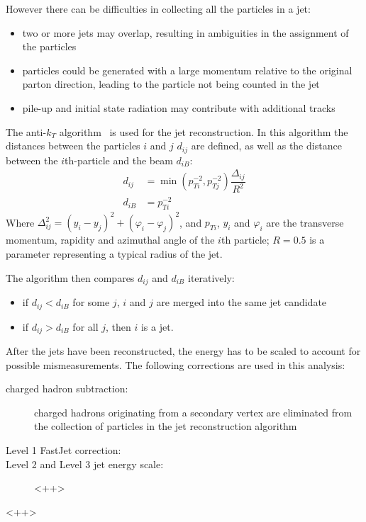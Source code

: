 However there can be difficulties in collecting all the particles in a jet:
\begin{itemize}
    \item two or more jets may overlap, resulting in ambiguities in the assignment of the particles
    \item particles could be generated with a large momentum relative to the
        original parton direction, leading to the particle not being counted
        in the jet
    \item pile-up and initial state radiation may contribute with additional
        tracks 
\end{itemize}
The anti-$k_T$ algorithm~\cite{antikt} is used for the jet reconstruction. In this
algorithm the distances between the particles $i$ and $j$ $d_{ij}$ are defined, as well
as the distance between the $i$th-particle and the beam $d_{iB}$:
\begin{align*}
    d_{ij} &= \min(p_{Ti}^{-2}, p_{Tj}^{-2})\dfrac{\Delta_{ij}}{R^2}\\
    d_{iB} &= p_{Ti}^{-2}
\end{align*}
Where $\Delta_{ij}^2 = (y_i - y_j)^2 + (\varphi_i - \varphi_j)^2$, and
$p_{Ti}$, $y_i$ and $\varphi_i$ are the transverse momentum, rapidity and
azimuthal angle of the $i$th particle; $R = 0.5$ is a parameter representing a
typical radius of the jet.

The algorithm then compares $d_{ij}$ and $d_{iB}$ iteratively:
\begin{itemize}
    \item if $d_{ij} < d_{iB}$ for some $j$, $i$ and $j$ are merged into the
        same jet candidate
    \item if $d_{ij} > d_{iB}$ for all $j$, then $i$ is a jet.
\end{itemize}

After the jets have been reconstructed, the energy has to be scaled to
account for possible mismeasurements. The following corrections
are used in this analysis:
\begin{description}
    \item[charged hadron subtraction:] charged hadrons originating from a
        secondary vertex are eliminated from the collection of particles
        in the jet reconstruction algorithm
    \item[Level 1 FastJet correction:] 
    \item[Level 2 and Level 3 jet energy scale:] <++>
\end{description}<++>
